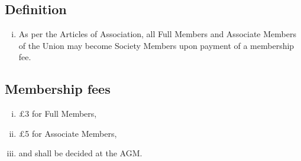 \subsection{Definition}
\begin{enumerate}[i.]
    \item As per the Articles of Association, all Full Members and Associate Members of the Union may become Society Members upon payment of a membership fee.
\end{enumerate}

\subsection{Membership fees}
\begin{enumerate}[i.]
    \item £3 for Full Members,
    \item £5 for Associate Members,
    \item and shall be decided at the AGM.
\end{enumerate}